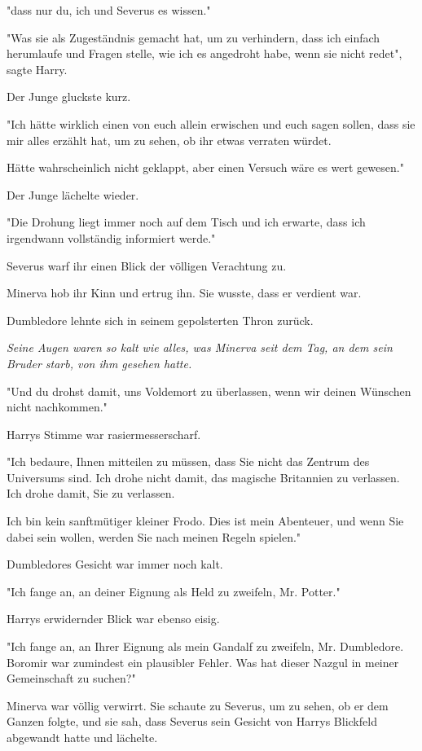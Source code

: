{"dass nur du, ich und Severus es wissen."

"Was sie als Zugeständnis gemacht hat, um zu verhindern, dass ich einfach herumlaufe und Fragen stelle, wie ich es angedroht habe, wenn sie nicht redet", sagte Harry.

Der Junge gluckste kurz.

"Ich hätte wirklich einen von euch allein erwischen und euch sagen sollen, dass sie mir alles erzählt hat, um zu sehen, ob ihr etwas verraten würdet.

Hätte wahrscheinlich nicht geklappt, aber einen Versuch wäre es wert gewesen."

Der Junge lächelte wieder.

"Die Drohung liegt immer noch auf dem Tisch und ich erwarte, dass ich irgendwann vollständig informiert werde."

Severus warf ihr einen Blick der völligen Verachtung zu.

Minerva hob ihr Kinn und ertrug ihn. Sie wusste, dass er verdient war.

Dumbledore lehnte sich in seinem gepolsterten Thron zurück.

\emph{Seine Augen waren so kalt wie alles, was Minerva seit dem Tag, an dem sein Bruder starb, von ihm gesehen hatte.}

"Und du drohst damit, uns Voldemort zu überlassen, wenn wir deinen Wünschen nicht nachkommen."

Harrys Stimme war rasiermesserscharf.

"Ich bedaure, Ihnen mitteilen zu müssen, dass Sie nicht das Zentrum des Universums sind. Ich drohe nicht damit, das magische Britannien zu verlassen. Ich drohe damit, Sie zu verlassen.

Ich bin kein sanftmütiger kleiner Frodo. Dies ist mein Abenteuer, und wenn Sie dabei sein wollen, werden Sie nach meinen Regeln spielen."

Dumbledores Gesicht war immer noch kalt.

"Ich fange an, an deiner Eignung als Held zu zweifeln, Mr. Potter."

Harrys erwidernder Blick war ebenso eisig.

"Ich fange an, an Ihrer Eignung als mein Gandalf zu zweifeln, Mr. Dumbledore. Boromir war zumindest ein plausibler Fehler. Was hat dieser Nazgul in meiner Gemeinschaft zu suchen?"

Minerva war völlig verwirrt. Sie schaute zu Severus, um zu sehen, ob er dem Ganzen folgte, und sie sah, dass Severus sein Gesicht von Harrys Blickfeld abgewandt hatte und lächelte.

}
